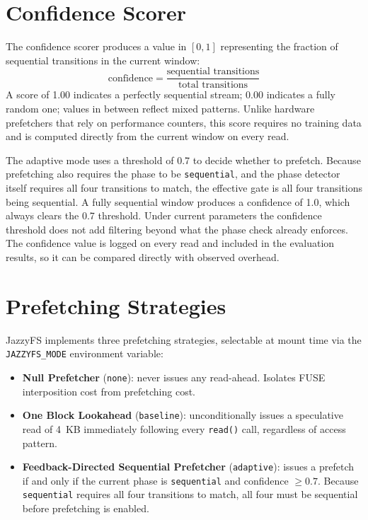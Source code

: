 \documentclass[12pt]{report}
\begin{document}
\section{Confidence Scorer}
\label{sec:design-confidence}

The confidence scorer produces a value in $[0, 1]$ representing the
fraction of sequential transitions in the current window:
\[
\text{confidence} = \frac{\text{sequential transitions}}{\text{total transitions}}
\]
A score of 1.00 indicates a perfectly sequential stream; 0.00 indicates
a fully random one; values in between reflect mixed patterns. Unlike
hardware prefetchers that rely on performance counters, this score requires
no training data and is computed directly from the current window on every
read.

The adaptive mode uses a threshold of 0.7 to decide whether to prefetch.
Because prefetching also requires the phase to be \texttt{sequential}, and
the phase detector itself requires all four transitions to match, the
effective gate is all four transitions being sequential. A fully sequential
window produces a confidence of 1.0, which always clears the 0.7 threshold.
Under current parameters the confidence threshold does not add filtering
beyond what the phase check already enforces. The confidence value is logged
on every read and included in the evaluation results, so it can be compared
directly with observed overhead.

\section{Prefetching Strategies}
\label{sec:design-strategies}

JazzyFS implements three prefetching strategies, selectable at mount time
via the \texttt{JAZZYFS\_MODE} environment variable:

\begin{itemize}
    \item \textbf{Null Prefetcher} (\texttt{none}): never issues any
    read-ahead. Isolates FUSE interposition cost from prefetching cost.

    \item \textbf{One Block Lookahead} (\texttt{baseline}): unconditionally
    issues a speculative read of 4~KB immediately following every
    \texttt{read()} call, regardless of access pattern.

    \item \textbf{Feedback-Directed Sequential Prefetcher}
    (\texttt{adaptive}): issues a prefetch if and only if the current phase
    is \texttt{sequential} and confidence $\geq 0.7$. Because
    \texttt{sequential} requires all four transitions to match, all four
    must be sequential before prefetching is enabled.
\end{itemize}
\end{document}

